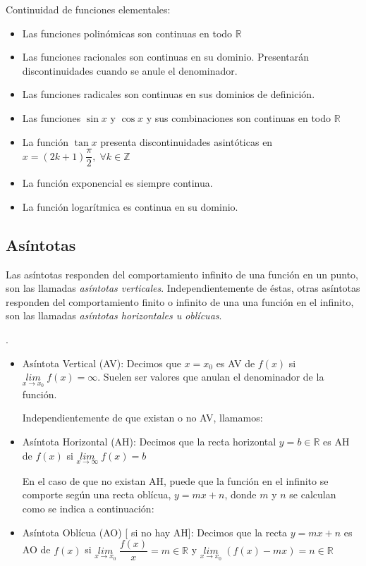 	\vspace{4mm}Continuidad de funciones elementales:
	\begin{itemize}
		\item Las funciones polinómicas son continuas en todo $\mathbb R$
		\item Las funciones racionales son continuas en su dominio. Presentarán discontinuidades cuando se anule el  denominador.
		\item Las funciones radicales son continuas en sus dominios de definición.
		\item Las funciones $\sin x$ y $\cos x$ y sus combinaciones son continuas en todo $\mathbb R$
		\item La función $\tan x$ presenta discontinuidades asintóticas en $x=(2k+1)\dfrac {\pi}{2},\; \forall k\in \mathbb Z$
		\item La función exponencial es siempre continua.
		\item La función logarítmica es continua en su dominio.
	\end{itemize}
	
	\subsection{Asíntotas}
	\label{subsec-asintotas}
	
	Las asíntotas responden del comportamiento infinito de una función en un punto, son las llamadas \emph{asíntotas verticales}. Independientemente de éstas, otras asíntotas responden del comportamiento finito o infinito de una una función en el infinito, son las llamadas \emph{asíntotas horizontales u oblícuas}.
	
	\begin{defi}.
	
	\begin{itemize}
		
		\item Asíntota Vertical (AV): Decimos que $x=x_0$ es AV de $f(x)$ si $\underset{x\to x_0}{lim}\;{f(x)}=\infty$. Suelen ser valores que anulan el denominador de la función.
		
		Independientemente de que existan o no AV, llamamos:
		
		\item Asíntota Horizontal (AH): Decimos que la recta horizontal $y=b\in \mathbb R$ es AH de $f(x)$ si $\underset{x\to \infty}{lim}\;{f(x)}=b$
		
		En el caso de que no existan AH, puede que la función en el infinito se comporte según una recta oblícua, $y=mx+n$, donde $m$ y $n$ se calculan como se indica a continuación:
		
		\item Asíntota Oblícua (AO) [ si no hay AH]: Decimos que la recta $y=mx+n$ es AO de $f(x)$ si $\underset{x\to x_0}{lim}\;{\dfrac {f(x)} {x} }=m\in \mathbb R$ y $\underset{x\to x_0}{lim}\;{(f(x)-mx)}=n \in \mathbb R$
	\end{itemize}
		
	\end{defi}
	
